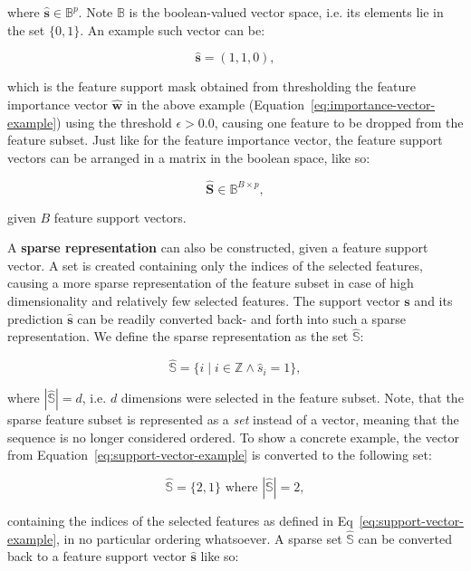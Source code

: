 \documentclass[../main.tex]{subfiles}
\begin{document}
where $\hat{\boldsymbol{s}} \in \mathbb{B}^p$. Note $\mathbb{B}$ is the boolean-valued vector space, i.e. its elements lie in the set $\{0, 1\}$. An example such vector can be:

\begin{equation}\label{eq:support-vector-example}
\hat{\boldsymbol{s}} = (1, 1, 0),
\end{equation}

which is the feature support mask obtained from thresholding the feature importance vector $\hat{\boldsymbol{w}}$ in the above example (Equation~\ref{eq:importance-vector-example}) using the threshold $\epsilon > 0.0$, causing one feature to be dropped from the feature subset. Just like for the feature importance vector, the feature support vectors can be arranged in a matrix in the boolean space, like so:

\begin{equation}\label{eq:feature-support-matrix}
\mathbf{\hat{S}} \in \mathbb{B}^{B \times p},
\end{equation}

given $B$ feature support vectors.

A \textbf{sparse representation} can also be constructed, given a feature support vector. A set is created containing only the indices of the selected features, causing a more sparse representation of the feature subset in case of high dimensionality and relatively few selected features. The support vector $\boldsymbol{s}$ and its prediction $\hat{\boldsymbol{s}}$ can be readily converted back- and forth into such a sparse representation. We define the sparse representation as the set $\hat{\mathbb{S}}$:

\begin{equation}
\hat{\mathbb{S}} = \{i \mid i \in \mathbb{Z} \wedge \hat{s}_i = 1 \},
\end{equation}

where $| \hat{\mathbb{S}} | = d$, i.e. $d$ dimensions were selected in the feature subset. Note, that the sparse feature subset is represented as a \textit{set} instead of a vector, meaning that the sequence is no longer considered ordered. To show a concrete example, the vector from Equation~\ref{eq:support-vector-example} is converted to the following set:

\begin{equation}
\hat{\mathbb{S}} = \{ 2, 1 \} \text{ where } | \hat{\mathbb{S}} | = 2,
\end{equation}

containing the indices of the selected features as defined in Eq~\ref{eq:support-vector-example}, in no particular ordering whatsoever. A sparse set $\hat{\mathbb{S}}$ can be converted back to a feature support vector $\hat{\boldsymbol{s}}$ like so:
\end{document}
